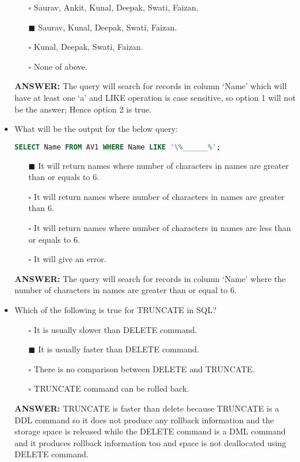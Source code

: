 \documentclass[10pt]{article}
\begin{document}
\begin{itemize}
			\begin{enumerate}
				\item[$\square$]  Saurav, Ankit, Kunal, Deepak, Swati, Faizan.
				\item[$\blacksquare$] Saurav, Kunal, Deepak, Swati, Faizan.
				\item[$\square$]  Kunal, Deepak, Swati, Faizan.
				\item[$\square$]  None of above.
			\end{enumerate}
			\color{red} \textbf{ANSWER:} \color{black} The query will search for records in column ‘Name’ which will have at least one ‘a’ and LIKE operation is case sensitive, so option 1 will not be the answer; Hence option 2 is true.

		\item What will be the output for the below query:
			\begin{lstlisting}[language=SQL,firstline=1, lastline=1] 
				SELECT Name FROM AV1 WHERE Name LIKE '\%______%';
			\end{lstlisting}

			\begin{enumerate}
				\item[$\blacksquare$] It will return names where number of characters in names are greater than or equals to 6.
				\item[$\square$] It will return names where number of characters in names are greater than 6.
				\item[$\square$] It will return names where number of characters in names are less than or equals to 6.
				\item[$\square$] It will give an error.
			\end{enumerate}
			\color{red} \textbf{ANSWER:} \color{black} The query will search for records in column ‘Name’ where the number of characters in names are greater than or equal to 6.

		\item Which of the following is true for TRUNCATE in SQL?
			\begin{enumerate}
				\item[$\square$] It is usually slower than DELETE command.
				\item[$\blacksquare$] It is usually faster than DELETE command.
				\item[$\square$] There is no comparison between DELETE and TRUNCATE.
				\item[$\square$] TRUNCATE command can be rolled back.
			\end{enumerate}
			\color{red} \textbf{ANSWER:} \color{black} TRUNCATE is faster than delete because TRUNCATE is a DDL command so it does not produce any rollback information and the storage space is released while the DELETE command is a DML command and it produces rollback information too and space is not deallocated using DELETE command.


\end{itemize}
\end{document}
